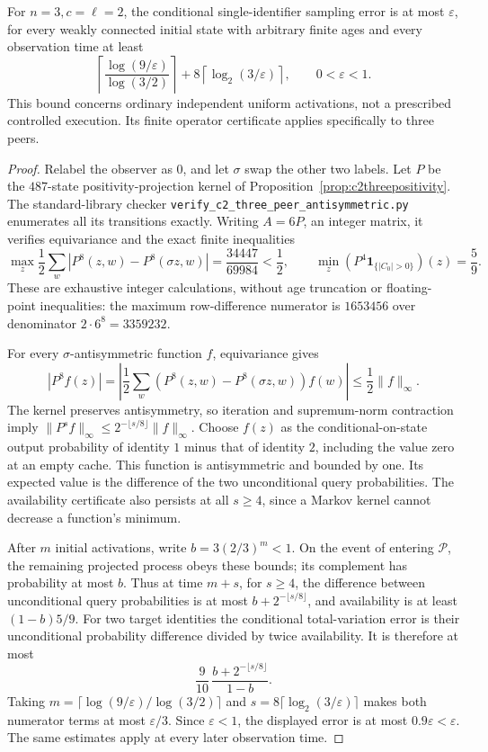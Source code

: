 \begin{proposition}
\label{prop:c2threeordinarysample}
For $n=3,c=\ell=2$, the conditional single-identifier sampling
error is at most $\varepsilon$, for every weakly connected
initial state with arbitrary finite ages and every observation
time at least
\[
 \left\lceil\frac{\log(9/\varepsilon)}{\log(3/2)}\right\rceil
 +8\left\lceil\log_2(3/\varepsilon)\right\rceil,
 \qquad 0<\varepsilon<1.
\]
This bound concerns ordinary independent uniform activations,
not a prescribed controlled execution. Its finite operator
certificate applies specifically to three peers.
\end{proposition}
\begin{proof}
Relabel the observer as $0$, and let $\sigma$ swap the other
two labels. Let $P$ be the $487$-state positivity-projection
kernel of Proposition~\ref{prop:c2threepositivity}.
The standard-library checker
\texttt{verify\_c2\_three\_peer\_antisymmetric.py}
enumerates all its transitions exactly. Writing $A=6P$, an
integer matrix, it verifies equivariance and the exact
finite inequalities
\[
 \max_z\frac12\sum_w
   \left|P^8(z,w)-P^8(\sigma z,w)\right|
   =\frac{34447}{69984}<\frac12,
 \qquad
 \min_z(P^4\mathbf1_{\{|C_0|>0\}})(z)=\frac59.
\]
These are exhaustive integer calculations, without age
truncation or floating-point inequalities: the maximum
row-difference numerator is $1653456$ over denominator
$2\cdot6^8=3359232$.

For every $\sigma$-antisymmetric function $f$,
equivariance gives
\[
 |P^8f(z)|
 =\left|\frac12\sum_w
       (P^8(z,w)-P^8(\sigma z,w))f(w)\right|
 \le\frac12\|f\|_\infty.
\]
The kernel preserves antisymmetry, so iteration and
supremum-norm contraction imply
$\|P^sf\|_\infty\le2^{-\lfloor s/8\rfloor}\|f\|_\infty$.
Choose $f(z)$ as the conditional-on-state output probability
of identity $1$ minus that of identity $2$, including the
value zero at an empty cache. This function is antisymmetric
and bounded by one. Its expected value is the difference of
the two unconditional query probabilities.
The availability certificate also persists at all $s\ge4$,
since a Markov kernel cannot decrease a function's minimum.

After $m$ initial activations, write $b=3(2/3)^m<1$.
On the event of entering $\mathcal P$, the remaining projected
process obeys these bounds; its complement has probability
at most $b$. Thus at time $m+s$, for $s\ge4$, the difference
between unconditional query probabilities is at most
$b+2^{-\lfloor s/8\rfloor}$, and availability is at least
$(1-b)5/9$. For two target identities the conditional
total-variation error is their unconditional probability
difference divided by twice availability. It is therefore
at most
\[
 \frac9{10}\,
 \frac{b+2^{-\lfloor s/8\rfloor}}{1-b}.
\]
Taking $m=\lceil\log(9/\varepsilon)/\log(3/2)\rceil$ and
$s=8\lceil\log_2(3/\varepsilon)\rceil$ makes both numerator
terms at most $\varepsilon/3$. Since $\varepsilon<1$, the
displayed error is at most $0.9\varepsilon<\varepsilon$.
The same estimates apply at every later observation time.
\end{proof}
